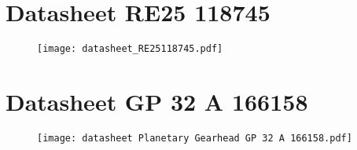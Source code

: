 \documentclass{article}
\begin{document}
\newpage



\newpage
\appendix 

  \section{Datasheet RE25 118745}
    \label{app:datasheet motor}
    \begin{figure}[htbp]
      \centering %
      \texttt{[image: datasheet\_RE25118745.pdf]}
    \end{figure}
    \cite{Maxon}

  \newpage

  \section{Datasheet GP 32 A 166158}
    \label{app:datasheet transmissie}
    \begin{figure}[htbp]
      \centering %
      \texttt{[image: datasheet Planetary Gearhead GP 32 A 166158.pdf]}
    \end{figure}
    \cite{Maxon}
\end{document}
